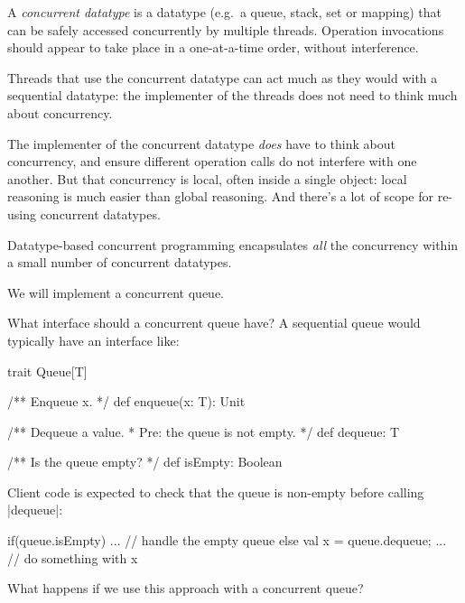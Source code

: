 \begin{slide}

A \emph{concurrent datatype} is a datatype (e.g.~a queue, stack, set or
mapping) that can be safely accessed concurrently by multiple threads.
Operation invocations should appear to take place in a one-at-a-time order,
without interference. 

Threads that use the concurrent datatype can act much as they would with a
sequential datatype: the implementer of the threads does not need to think
much about concurrency.  

The implementer of the concurrent datatype \emph{does} have to think about
concurrency, and ensure different operation calls do not interfere with one
another.  But that concurrency is local, often inside a single object: local
reasoning is much easier than global reasoning.  And there's a lot of scope
for re-using concurrent datatypes.

Datatype-based concurrent programming encapsulates \emph{all} the concurrency
within a small number of concurrent datatypes.
\end{slide}


\begin{slide}

We will implement a concurrent queue.

What interface should a concurrent queue have?  A sequential queue would
typically have an interface like:

\begin{scala}
trait Queue[T]{
  /** Enqueue x. */
  def enqueue(x: T): Unit

  /** Dequeue a value.  
    * Pre: the queue is not empty. */
  def dequeue: T

  /** Is the queue empty? */
  def isEmpty: Boolean
}
\end{scala}
\end{slide}


\begin{slide}

Client code is expected to check that the queue is non-empty before calling
|dequeue|:
\begin{scala}
  if(queue.isEmpty){ 
    ... // handle the empty queue
  } 
  else{ 
    val x = queue.dequeue; ... // do something with x
  }
\end{scala}

What happens if we use this approach  with a concurrent queue?
\end{slide} 

